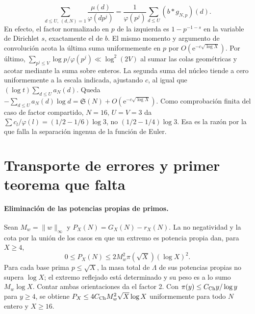\documentclass[11pt,a4paper]{article}
\newcommand{\B}[2]{#2}
\newcommand{\B}[2]{#1}
\newcommand{\e}{\mathrm e}
\newcommand{\Sg}{\mathfrak S}
\begin{document}
\[
 \sum_{d\le U,\ (d,N)=1}\frac{\mu(d)}{\varphi(dp^j)}
 =\frac{1}{\varphi(p^j)}\sum_{d\le U}(b*g_{N,p})(d).
\]
\B{Indeed the normalized $p$-factor on the left is $1-p^{-1-s}$ in the Dirichlet series variable $s$, exactly that of $b$. The same moment and convolution argument bounds the last sum uniformly in $p$ by $O(\e^{-c\sqrt{\log X}})$. Finally $\sum_{p^j\le V}\log p/\varphi(p^j)\ll\log^2(2V)$ by summing the geometric tails and bounding by the corresponding integer sum. Therefore the second sum in the kernel tends uniformly to zero at the asserted scale, after adjusting $c$, as does $(\log t)\sum_{d\le U}a_N(d)$. The remaining term is $-\sum_{d\le U}a_N(d)\log d=\Sg(N)+O(\e^{-c\sqrt{\log X}})$. For a finite check of the shared-prime term, $N=16$, $U=V=3$ gives $\sum c_l/\varphi(l)=(1/2-1/6)\log3$, not $(1/2-1/4)\log3$. This is why naive totient separation fails.}{En efecto, el factor normalizado en $p$ de la izquierda es $1-p^{-1-s}$ en la variable de Dirichlet $s$, exactamente el de $b$. El mismo momento y argumento de convolución acota la última suma uniformemente en $p$ por $O(\e^{-c\sqrt{\log X}})$. Por último, $\sum_{p^j\le V}\log p/\varphi(p^j)\ll\log^2(2V)$ al sumar las colas geométricas y acotar mediante la suma sobre enteros. La segunda suma del núcleo tiende a cero uniformemente a la escala indicada, ajustando $c$, al igual que $(\log t)\sum_{d\le U}a_N(d)$. Queda $-\sum_{d\le U}a_N(d)\log d=\Sg(N)+O(\e^{-c\sqrt{\log X}})$. Como comprobación finita del caso de factor compartido, $N=16$, $U=V=3$ da $\sum c_l/\varphi(l)=(1/2-1/6)\log3$, no $(1/2-1/4)\log3$. Esa es la razón por la que falla la separación ingenua de la función de Euler.}

\section{\B{Error transport and the first missing theorem}{Transporte de errores y primer teorema que falta}}\label{sec:stop}
\paragraph{\B{Removing proper prime powers.}{Eliminación de las potencias propias de primos.}}
\B{Set $M_w=\|w\|_\infty$ and let $P_X(N)=G_X(N)-r_X(N)$. Nonnegativity and a union bound on which endpoint is a proper power give, for $X\ge4$,}{Sean $M_w=\|w\|_\infty$ y $P_X(N)=G_X(N)-r_X(N)$. La no negatividad y la cota por la unión de los casos en que un extremo es potencia propia dan, para $X\ge4$,}
\[
 0\le P_X(N)\le 2 M_w^2\pi(\sqrt X)(\log X)^2.
\]
\B{For each prime base $p\le\sqrt X$, the total proper-power $\Lambda$-mass is at most $\log X$; the reflected endpoint is uniquely determined and its weight is at most $M_w\log X$. Counting both orientations yields the factor 2. With $\pi(y)\le C_{\rm Ch}y/\log y$ for $y\ge4$, this gives $P_X\le 4C_{\rm Ch}M_w^2\sqrt X\log X$ uniformly in integer $N$ for $X\ge16$.}{Para cada base prima $p\le\sqrt X$, la masa total de $\Lambda$ de sus potencias propias no supera $\log X$; el extremo reflejado está determinado y su peso es a lo sumo $M_w\log X$. Contar ambas orientaciones da el factor 2. Con $\pi(y)\le C_{\rm Ch}y/\log y$ para $y\ge4$, se obtiene $P_X\le 4C_{\rm Ch}M_w^2\sqrt X\log X$ uniformemente para todo $N$ entero y $X\ge16$.}
\end{document}
